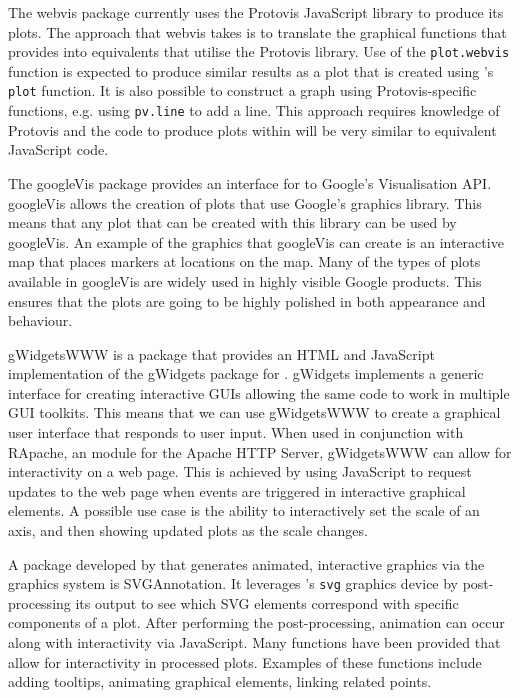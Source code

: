 The \textsf{webvis} package currently uses the Protovis JavaScript library to produce its plots.
The approach that \textsf{webvis} takes is to translate the graphical functions that \R{} provides into equivalents that utilise the Protovis library.
Use of the \texttt{plot.webvis} function is expected to produce similar results as a plot that is created using \R{}'s \texttt{plot} function.
It is also possible to construct a graph using Protovis-specific functions, e.g. using \texttt{pv.line} to add a line.
This approach requires knowledge of Protovis and the code to produce plots within \R{} will be very similar to equivalent JavaScript code.

The \textsf{googleVis} package provides an interface for \R{} to Google's Visualisation API.
\textsf{googleVis} allows the creation of plots that use Google's graphics library.
This means that any plot that can be created with this library can be used by \textsf{googleVis}.
An example of the graphics that \textsf{googleVis} can create is an interactive map that places markers at locations on the map.
Many of the types of plots available in \textsf{googleVis} are widely used in highly visible Google products.
This ensures that the plots are going to be highly polished in both appearance and behaviour.

\textsf{gWidgetsWWW} is a package that provides an HTML and JavaScript implementation of the \textsf{gWidgets} package for \R{}.
\textsf{gWidgets} implements a generic interface for creating interactive GUIs allowing the same \R{} code to work in multiple GUI toolkits.
This means that we can use \textsf{gWidgetsWWW} to create a graphical user interface that responds to user input.
When used in conjunction with \textsf{RApache}, an \R{} module for the Apache HTTP Server, \textsf{gWidgetsWWW} can allow for interactivity on a web page.
This is achieved by using JavaScript to request updates to the web page when events are triggered in interactive graphical elements.
A possible use case is the ability to interactively set the scale of an axis, and then showing updated plots as the scale changes.

A package developed by \citet{SVGAnnotation} that generates animated, interactive graphics via the \R{} graphics system is \textsf{SVGAnnotation}.
It leverages \R{}'s \texttt{svg} graphics device by post-processing its output to see which SVG elements correspond with specific components of a plot.
After performing the post-processing, animation can occur along with interactivity via JavaScript.
Many functions have been provided that allow for interactivity in processed plots.
Examples of these functions include adding tooltips, animating graphical elements, linking related points.

